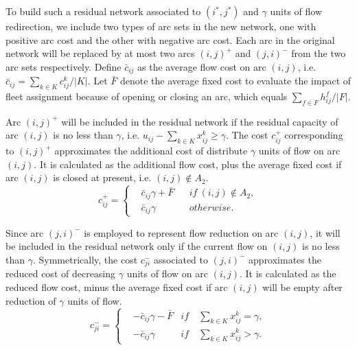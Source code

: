 \documentclass[11pt,nonblindrev,fleqn]{article}
\begin{document}
To build such a residual network associated to $(i^*,j^*)$ and $\gamma$ units of flow redirection, we include two types of arc sets in the new network, one with positive arc cost and the other with negative arc cost. Each arc in the original network will be replaced by at most two arcs $(i,j)^+$ and $(j,i)^-$ from the two arc sets respectively. Define $\bar{c}_{ij}$ as the average flow cost on arc $(i,j)$, i.e. $\bar{c}_{ij} = \sum_{k\in K} c_{ij}^k / |K|$. Let $\bar{F}$ denote the average fixed cost to evaluate the impact of fleet assignment because of opening or closing an arc, which equals $\sum_{f\in F}h_{ij}^f/ |F|$.

Arc $(i,j)^+$ will be included in the residual network if the residual capacity of arc $(i,j)$ is no less than $\gamma$, i.e. $ u_{ij} - \sum_{k\in K} x_{ij}^k \geq \gamma$. The cost $c_{ij}^+$ corresponding to $(i,j)^+$ approximates the additional cost of distribute $\gamma$ units of flow on arc $(i,j)$. It is calculated as the additional flow cost, plus the average fixed cost if arc $(i,j)$ is closed at present, i.e. $(i,j) \notin A_2$.
\begin{equation*}
c_{ij}^+ = \left\{
\begin{aligned}
&\bar{c}_{ij} \gamma + \bar{F}  & & if\ (i,j) \notin A_2, \\
&\bar{c}_{ij} \gamma                 & & otherwise.
\end{aligned}
\right.
\end{equation*}

Since arc $(j,i)^-$ is employed to represent flow reduction on arc $(i,j)$, it will be included in the residual network only if the current flow on $(i,j)$ is no less than $\gamma$. Symmetrically, the cost $c_{ji}^-$ associated to $(j,i)^-$ approximates the reduced cost of decreasing $\gamma$ units of flow on arc $(i,j)$. It is calculated as the reduced flow cost, minus the average fixed cost if arc $(i,j)$ will be empty after reduction of $\gamma$ units of flow.
\begin{equation*}
c_{ji}^- = \left\{
\begin{aligned}
&-\bar{c}_{ij} \gamma - \bar{F}  &if \ & \sum_{k\in K} x_{ij}^k = \gamma, \\
&-\bar{c}_{ij} \gamma                  &if \ &\sum_{k\in K} x_{ij}^k > \gamma.
\end{aligned}
\right.
\end{equation*}
\end{document}
